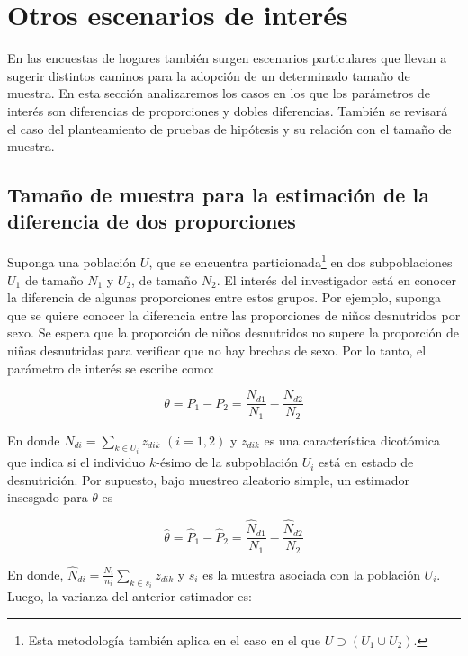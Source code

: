 \documentclass[
  12pt,
  spanish,
]{book}
\begin{document}
\hypertarget{otros-escenarios-de-interuxe9s}{%
\section{Otros escenarios de interés}\label{otros-escenarios-de-interuxe9s}}

En las encuestas de hogares también surgen escenarios particulares que llevan a sugerir distintos caminos para la adopción de un determinado tamaño de muestra. En esta sección analizaremos los casos en los que los parámetros de interés son diferencias de proporciones y dobles diferencias. También se revisará el caso del planteamiento de pruebas de hipótesis y su relación con el tamaño de muestra.

\hypertarget{tamauxf1o-de-muestra-para-la-estimaciuxf3n-de-la-diferencia-de-dos-proporciones}{%
\subsection{Tamaño de muestra para la estimación de la diferencia de dos proporciones}\label{tamauxf1o-de-muestra-para-la-estimaciuxf3n-de-la-diferencia-de-dos-proporciones}}

Suponga una población \(U\), que se encuentra particionada\footnote{Esta metodología también aplica en el caso en el que \(U \supset (U_1 \cup U_2)\).} en dos subpoblaciones \(U_1\) de tamaño \(N_1\) y \(U_2\), de tamaño \(N_2\). El interés del investigador está en conocer la diferencia de algunas proporciones entre estos grupos. Por ejemplo, suponga que se quiere conocer la diferencia entre las proporciones de niños desnutridos por sexo. Se espera que la proporción de niños desnutridos no supere la proporción de niñas desnutridas para verificar que no hay brechas de sexo. Por lo tanto, el parámetro de interés se escribe como:

\[
\theta=P_1-P_2=\frac{N_{d1}}{N_1}-\frac{N_{d2}}{N_2}
\]

En donde \(N_{di}=\sum_{k\in U_i}z_{dik}\) \((i=1,2)\) y \(z_{dik}\) es una característica dicotómica que indica si el individuo \(k\)-ésimo de la subpoblación \(U_i\) está en estado de desnutrición. Por supuesto, bajo muestreo aleatorio simple, un estimador insesgado para \(\theta\) es

\[
\hat{\theta}=\hat{P}_1-\hat{P}_2=\frac{\hat{N}_{d1}}{N_1}-\frac{\hat{N}_{d2}}{N_2}
\]

En donde, \(\hat{N}_{di}=\frac{N_i}{n_i}\sum_{k\in s_i}z_{dik}\) y \(s_i\) es la muestra asociada con la población \(U_i\). Luego, la varianza del anterior estimador es:
\end{document}
